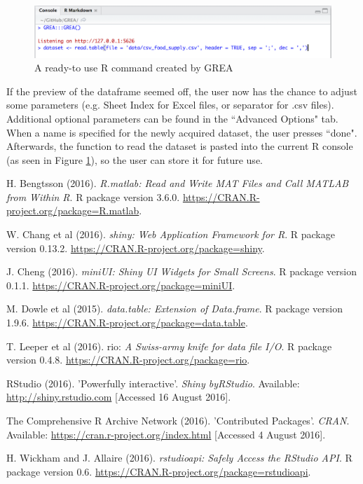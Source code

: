 \documentclass[12pt]{article} %
\begin{document}
\begin{figure}
\center
\includegraphics[scale = 0.8]{figures/step3.png}
\caption{A ready-to use R command created by GREA}
\label{stepthree}
\end{figure}

If the preview of the dataframe seemed off, the user now has the chance to adjust some parameters (e.g. Sheet Index for Excel files, or separator for .csv files). Additional optional parameters can be found in the ``Advanced Options" tab. When a name is specified for the newly acquired dataset, the user presses ``done". Afterwards, the function to read the dataset is pasted into the current R console (as seen in Figure \ref{stepthree}), so the user can store it for future use.


\clearpage

\begin{thebibliography}{59}
\begin{singlespace}

H. Bengtsson (2016). \emph{R.matlab: Read and Write MAT Files and Call
MATLAB from Within R}. R package version 3.6.0.
\url{https://CRAN.R-project.org/package=R.matlab}.

W. Chang et al (2016).
\emph{shiny: Web Application Framework for R}. R package version 0.13.2.
\url{https://CRAN.R-project.org/package=shiny}.

J. Cheng (2016). \emph{miniUI: Shiny UI Widgets for Small Screens}. R
package version 0.1.1. \url{https://CRAN.R-project.org/package=miniUI}.

M. Dowle et al (2015). \emph{data.table: Extension of Data.frame}. R
package version 1.9.6. \url{https://CRAN.R-project.org/package=data.table}.

T. Leeper et al (2016). rio: \emph{A Swiss-army knife for data file I/O}. R package version 0.4.8. 
\url{https://CRAN.R-project.org/package=rio}.

RStudio (2016). 'Powerfully interactive'. \emph{Shiny byRStudio}.
Available: \url{http://shiny.rstudio.com} 
[Accessed 16 August 2016].

The Comprehensive R Archive Network (2016). 'Contributed Packages'. \emph{CRAN}.
Available: \url{https://cran.r-project.org/index.html} 
[Accessed 4 August 2016].

H. Wickham and J. Allaire (2016). \emph{rstudioapi: Safely Access the
RStudio API}. R package version 0.6.
\url{https://CRAN.R-project.org/package=rstudioapi}.





\end{singlespace}
\end{thebibliography}
\end{document}
